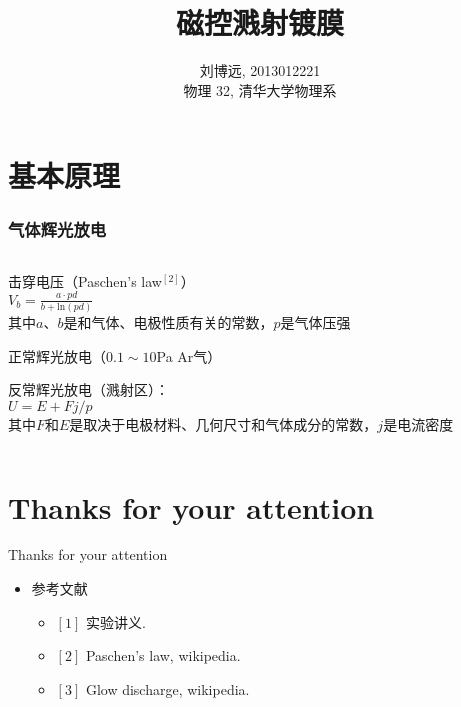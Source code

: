 \documentclass[cjk,slidestop,compress,mathserif]{beamer}
\author{刘博远, 2013012221\\ 物理 32, 清华大学物理系}
\title{磁控溅射镀膜}
\newcommand{\uln}{\mathrm{ln}}
\begin{document}
\begin{frame}
\titlepage
\end{frame}
\section{基本原理}
\begin{frame}
\frametitle{气体辉光放电}

\begin{itemize}
\begin{columns}

\begin{column}{0.65\textwidth}
\pause \item 击穿电压（Paschen's law$^{[2]}$）\\
\pause $V_{b}=\frac{a\cdot pd}{b+\uln(pd)}$\\
其中$a$、$b$是和气体、电极性质有关的常数，$p$是气体压强 
\pause \item 正常辉光放电（$0.1\sim 10$Pa Ar气）
\pause \item 反常辉光放电（溅射区）：\\
\pause $U=E+Fj/p$\\
其中$F$和$E$是取决于电极材料、几何尺寸和气体成分的常数，$j$是电流密度
\end{column}

\end{columns}
\end{itemize}
\end{frame}

\section{Thanks for your attention}
\begin{frame}
\centering
\large{Thanks for your attention}
\begin{itemize}
\item 参考文献
\begin{itemize}
\item $[1]$ 实验讲义. \\
\item $[2]$ Paschen's law, wikipedia.
\item $[3]$ Glow discharge, wikipedia. 
\end{itemize}
\end{itemize}
\end{frame}
\end{document}
